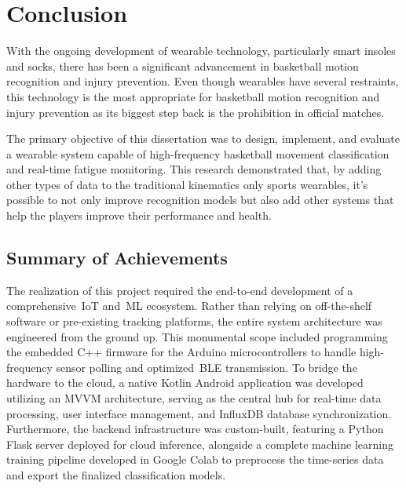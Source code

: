 


%

\chapter{Conclusion}
\label{cha:conclusion}

With the ongoing development of wearable technology, particularly smart insoles and socks, there has been a significant advancement in basketball motion recognition and 
injury prevention. Even though wearables have several restraints, this technology is the most appropriate for basketball motion recognition and injury prevention as its biggest step 
back is the prohibition in official matches.

The primary objective of this dissertation was to design, implement, and evaluate a  wearable system capable of high-frequency basketball movement classification and real-time fatigue monitoring. This research demonstrated 
that, by adding other types of data to the traditional kinematics only sports wearables, it's possible to not only improve recognition models but also add other systems that help the players improve their performance 
and health.

\section{Summary of Achievements}
\label{sec:conclusion_achievements}

The realization of this project required the end-to-end development of a comprehensive~\gls{IoT} and~\gls{ML} ecosystem. Rather than relying on off-the-shelf software or pre-existing tracking 
platforms, the entire system architecture was engineered from the ground up. This monumental scope included programming the embedded C++ firmware for the Arduino microcontrollers to handle high-frequency sensor 
polling and optimized~\gls{BLE} transmission. To bridge the hardware to the cloud, a native Kotlin Android application was developed utilizing an MVVM architecture, serving as the central hub for real-time data 
processing, user interface management, and InfluxDB database synchronization. Furthermore, the backend infrastructure was custom-built, featuring a Python Flask server deployed for cloud inference, alongside a 
complete machine learning training pipeline developed in Google Colab to preprocess the time-series data and export the finalized classification models.


